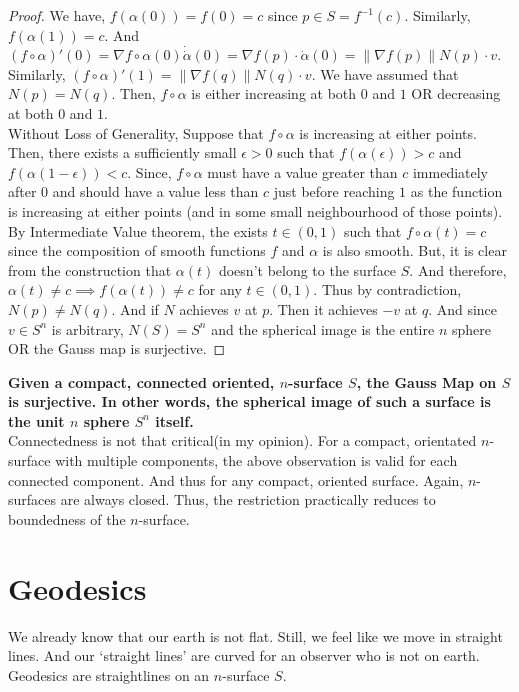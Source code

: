 \begin{proof}
	We have, $f(\alpha(0)) = f(0) = c$ since $p \in S = f^{-1}(c)$.
	Similarly, $f(\alpha(1)) = c$.
	And $(f \circ \alpha)'(0) = \nabla f \circ \alpha(0) \dot \dot{\alpha}(0) = \nabla f(p) \cdot \dot{\alpha}(0) = \| \nabla f(p) \| N(p) \cdot v$.
	Similarly, $(f \circ \alpha)'(1) = \| \nabla f(q) \| N(q) \cdot v$.
	We have assumed that $N(p) = N(q)$.
	Then, $f \circ \alpha$ is either increasing at both $0$ and $1$ OR decreasing at both $0$ and $1$.\\


	Without Loss of Generality, Suppose that $f \circ \alpha$ is increasing at either points.
	Then, there exists a sufficiently small $\epsilon > 0$ such that $f(\alpha(\epsilon)) > c$ and $f(\alpha(1-\epsilon)) < c$.
	Since, $f \circ \alpha$ must have a value greater than $c$ immediately after $0$ and should have a value less than $c$ just before reaching $1$ as the function is increasing at either points (and in some small neighbourhood of those points).\\

	By Intermediate Value theorem, the exists $t \in (0,1)$ such that $f \circ \alpha(t) = c$ since the composition of smooth functions $f$ and $\alpha$ is also smooth.
	But, it is clear from the construction that $\alpha(t)$ doesn't belong to the surface $S$.
	And therefore, $\alpha(t) \ne c \implies f(\alpha(t)) \ne c$ for any $t \in (0,1)$.
	Thus by contradiction, $N(p) \ne N(q)$.
	And if $N$ achieves $v$ at $p$.
	Then it achieves $-v$ at $q$.
	And since $v \in S^n$ is arbitrary, $N(S) = S^n$ and the spherical image is the entire $n$ sphere OR the Gauss map is surjective.
\end{proof}

	\textbf{Given a compact, connected oriented, $n$-surface $S$, the Gauss Map on $S$ is surjective.
	In other words, the spherical image of such a surface is the unit $n$ sphere $S^n$ itself.}\\


	Connectedness is not that critical(in my opinion).
	For a compact, orientated $n$-surface with multiple components, the above observation is valid for each connected component.
	And thus for any compact, oriented surface.
	Again, $n$-surfaces are always closed.
	Thus, the restriction practically reduces to boundedness of the $n$-surface.

\section{Geodesics}
	We already know that our earth is not flat.
	Still, we feel like we move in straight lines.
	And our `straight lines' are curved for an observer who is not on earth.
	Geodesics are straightlines on an $n$-surface $S$.

